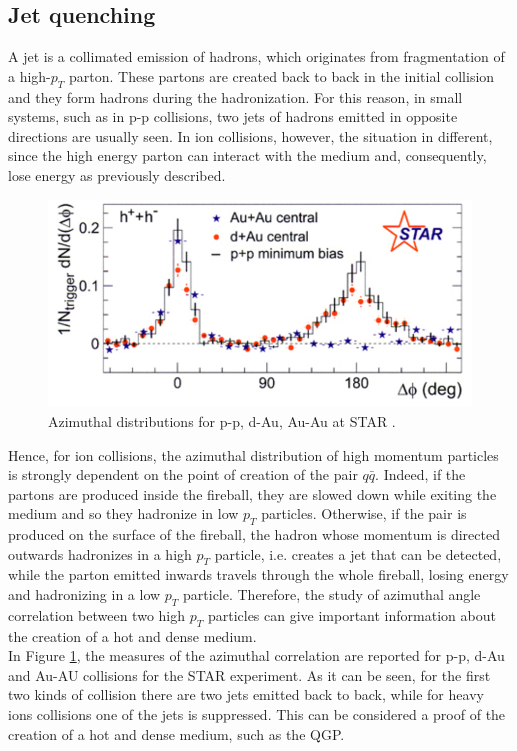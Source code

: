 \subsection{Jet quenching}
A jet is a collimated emission of hadrons, which originates from fragmentation of a high-$p_{T}$ parton. These partons are created back to back in the initial collision and they form hadrons during the hadronization. For this reason, in small systems, such as in p-p collisions, two jets of hadrons emitted in opposite directions are usually seen. In ion collisions, however, the situation in different, since the high energy parton can interact with the medium and, consequently, lose energy as previously described.
%
\begin{figure}
  \centering
  \includegraphics[scale=0.3]{figures/zoom.jpeg}
  \caption{Azimuthal distributions for p-p, d-Au, Au-Au at STAR \cite{jets}.}
  \label{fig:jet}
\end{figure}
%
Hence, for ion collisions, the azimuthal distribution of high momentum particles is strongly dependent on the point of creation of the pair $q\bar{q}$. Indeed, if the partons are produced inside the fireball, they are slowed down while exiting the medium and so they hadronize in low $p_{T}$ particles. Otherwise, if the pair is produced on the surface of the fireball, the hadron whose momentum is directed outwards hadronizes in a high $p_{T}$ particle, i.e. creates a jet that can be detected, while the parton emitted inwards travels through the whole fireball, losing energy and hadronizing in a low $p_{T}$ particle. Therefore, the study of azimuthal angle correlation between two high $p_{T}$ particles can give important information about the creation of a hot and dense medium.\\
In Figure \ref{fig:jet}, the measures of the azimuthal correlation are reported for p-p, d-Au and Au-AU collisions for the STAR experiment. As it can be seen, for the first two kinds of collision there are two jets emitted back to back, while for heavy ions collisions one of the jets is suppressed. This can be considered a proof of the creation of a hot and dense medium, such as the QGP.\\
%
